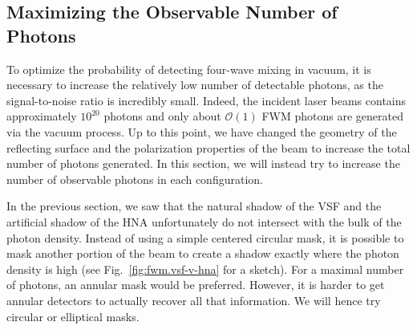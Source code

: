 \documentclass[11pt,SymmetricalJury]{inrsthesis/inrsthesis}
\begin{document}
\subsection{Maximizing the Observable Number of Photons}

To optimize the probability of detecting four-wave mixing in vacuum, it is
necessary to increase the relatively low number of detectable photons, as the
signal-to-noise ratio is incredibly small. Indeed, the incident laser beams
contains approximately $10^{20}$ photons and only about $\mathcal{O}(1)$ FWM
photons are generated via the vacuum process.  Up to this point, we have changed
the geometry of the reflecting surface and the polarization properties of the
beam to increase the total number of photons generated. In this section, we will
instead try to increase the number of observable photons in each configuration.

In the previous section, we saw that the natural shadow of the VSF and the
artificial shadow of the HNA unfortunately do not intersect with the bulk
of the photon density. Instead of using a simple centered circular mask,
it is possible to mask another portion of the beam to create a shadow exactly
where the photon density is high (see Fig.~\ref{fig:fwm.vsf-v-hna} for a sketch).
For a maximal number of photons, an annular mask would be preferred. However,
it is harder to get annular detectors to actually recover all that information.
We will hence try circular or elliptical masks.
\end{document}
